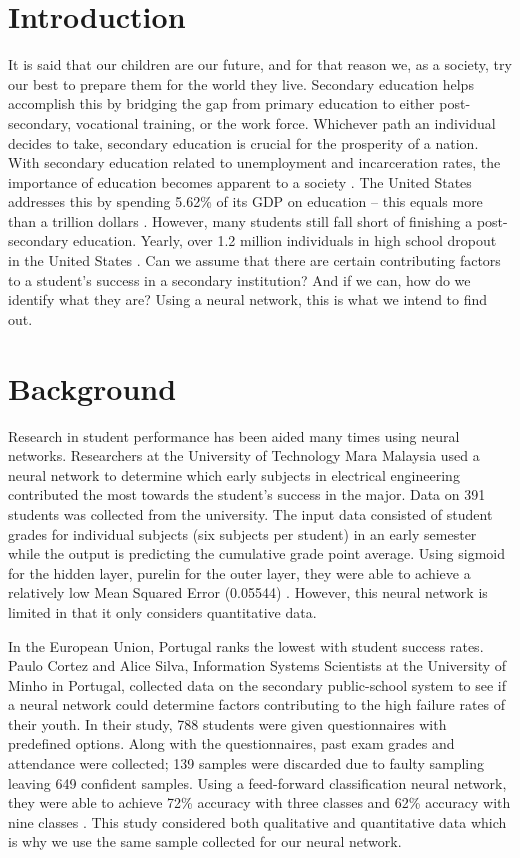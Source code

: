 \documentclass[conference]{IEEEtran}
\begin{document}
\section{Introduction}

It is said that our children are our future, and for that reason we, as a society, try our best to prepare them for the world they live. Secondary education helps accomplish this by bridging the gap from primary education to either post-secondary, vocational training, or the work force. Whichever path an individual decides to take, secondary education is crucial for the prosperity of a nation. With secondary education related to unemployment and incarceration rates, the importance of education becomes apparent to a society \cite{mitra}. The United States addresses this by spending 5.62\% of its GDP on education -- this equals more than a trillion dollars \cite{nationmaster}. However, many students still fall short of finishing a post-secondary education. Yearly, over 1.2 million individuals in high school dropout in the United States \cite{miller2011}. Can we assume that there are certain contributing factors to a student's success in a secondary institution? And if we can, how do we identify what they are?  Using a neural network, this is what we intend to find out. 

\section{Background}

Research in student performance has been aided many times using neural networks. Researchers at the University of Technology Mara Malaysia used a neural network to determine which early subjects in electrical engineering contributed the most towards the student’s success in the major. Data on 391 students was collected from the university. The input data consisted of student grades for individual subjects (six subjects per student) in an early semester while the output is predicting the cumulative grade point average. Using sigmoid for the hidden layer, purelin for the outer layer, they were able to achieve a relatively low Mean Squared Error (0.05544) \cite{arsad2013}. However, this neural network is limited in that it only considers quantitative data. 

 In the European Union, Portugal ranks the lowest with student success rates. Paulo Cortez and Alice Silva, Information Systems Scientists at the University of Minho in Portugal, collected data on the secondary public-school system to see if a neural network could determine factors contributing to the high failure rates of their youth. In their study, 788 students were given questionnaires with predefined options. Along with the questionnaires, past exam grades and attendance were collected; 139 samples were discarded due to faulty sampling leaving 649 confident samples. Using a feed-forward classification neural network, they were able to achieve 72\% accuracy with three classes and 62\% accuracy with nine classes \cite{cortez2008}. This study considered both qualitative and quantitative data which is why we use the same sample collected for our neural network. 
\end{document}
